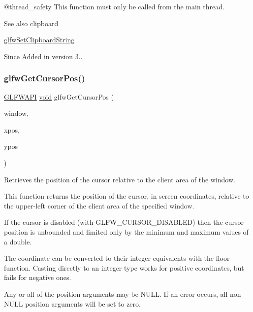 @thread\+\_\+safety This function must only be called from the main thread.

\begin{DoxySeeAlso}{See also}
clipboard 

\mbox{\hyperlink{group__input_ga7a580309bbc185a0459c3559021d2fd7}{glfw\+Set\+Clipboard\+String}}
\end{DoxySeeAlso}
\begin{DoxySince}{Since}
Added in version 3.. 
\end{DoxySince}
\mbox{\label{group__input_gad289438eb7cf53d11eca685373f44105}} 
\subsubsection{\texorpdfstring{glfwGetCursorPos()}{glfwGetCursorPos()}}
{\footnotesize\ttfamily \mbox{\hyperlink{glfw3_8h_a56da5036b2cc259351ae22fd6439bb47}{G\+L\+F\+W\+A\+PI}} \mbox{\hyperlink{glad_8h_a950fc91edb4504f62f1c577bf4727c29}{void}} glfw\+Get\+Cursor\+Pos (\begin{DoxyParamCaption}\item[{\mbox{\hyperlink{group__window_ga3c96d80d363e67d13a41b5d1821f3242}{G\+L\+F\+Wwindow}} $\ast$}]{window,  }\item[{double $\ast$}]{xpos,  }\item[{double $\ast$}]{ypos }\end{DoxyParamCaption})}



Retrieves the position of the cursor relative to the client area of the window. 

This function returns the position of the cursor, in screen coordinates, relative to the upper-\/left corner of the client area of the specified window.

If the cursor is disabled (with {\ttfamily G\+L\+F\+W\+\_\+\+C\+U\+R\+S\+O\+R\+\_\+\+D\+I\+S\+A\+B\+L\+ED}) then the cursor position is unbounded and limited only by the minimum and maximum values of a {\ttfamily double}.

The coordinate can be converted to their integer equivalents with the {\ttfamily floor} function. Casting directly to an integer type works for positive coordinates, but fails for negative ones.

Any or all of the position arguments may be {\ttfamily N\+U\+LL}. If an error occurs, all non-\/{\ttfamily N\+U\+LL} position arguments will be set to zero.


